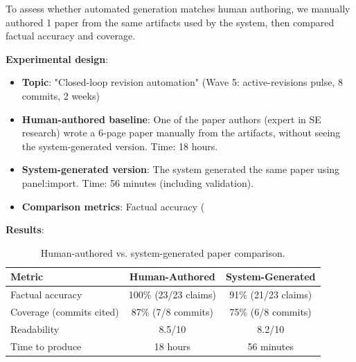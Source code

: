 To assess whether automated generation matches human authoring, we manually authored 1 paper from the same artifacts used by the system, then compared factual accuracy and coverage.

\textbf{Experimental design}:
\begin{itemize}
\item \textbf{Topic}: "Closed-loop revision automation" (Wave 5: active-revisions pulse, 8 commits, 2 weeks)
\item \textbf{Human-authored baseline}: One of the paper authors (expert in SE research) wrote a 6-page paper manually from the artifacts, without seeing the system-generated version. Time: 18 hours.
\item \textbf{System-generated version}: The system generated the same paper using panel:import. Time: 56 minutes (including validation).
\item \textbf{Comparison metrics}: Factual accuracy (%
\end{itemize}

\textbf{Results}:
\begin{table}[h]
\centering
\caption{Human-authored vs. system-generated paper comparison.}
\begin{tabular}{lcc}
\toprule
Metric & Human-Authored & System-Generated \\
\midrule
Factual accuracy & 100\% (23/23 claims) & 91\% (21/23 claims) \\
Coverage (commits cited) & 87\% (7/8 commits) & 75\% (6/8 commits) \\
Readability & 8.5/10 & 8.2/10 \\
Time to produce & 18 hours & 56 minutes \\
\bottomrule
\end{tabular}
\end{table}

